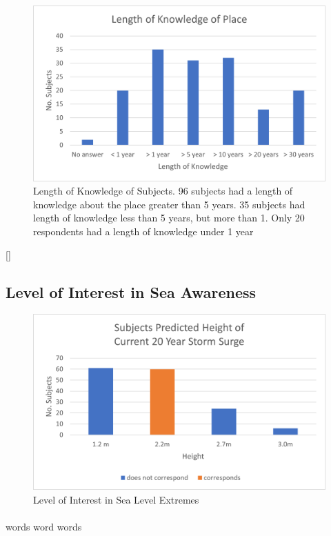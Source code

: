 \begin{figure}[h!]
    \centering
    \includegraphics{fig_results/long_know.png}
    \caption{Length of Knowledge of Subjects. 96 subjects had a length of knowledge about the place greater than 5 years. 35 subjects had length of knowledge less than 5 years, but more than 1. Only 20 respondents had a length of knowledge under 1 year}
    \label{fig:long_know}
\end{figure}[]


\subsection{Level of Interest in Sea Awareness}

\begin{figure}[h]
    \centering
    \includegraphics{fig_results/2022-20yrss-answer.png}
    \caption{Level of Interest in Sea Level Extremes}
    \label{fig:my_label}
\end{figure}
\paragraph{}
words word words



